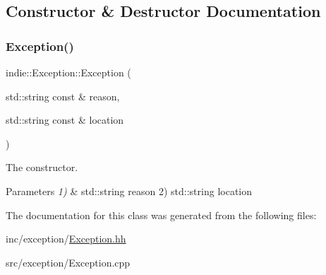\subsection{Constructor \& Destructor Documentation}
\mbox{\label{classindie_1_1Exception_a68279adc3c4acbc7f43c76502f8dd19b}} 
\subsubsection{\texorpdfstring{Exception()}{Exception()}}
{\footnotesize\ttfamily indie\+::\+Exception\+::\+Exception (\begin{DoxyParamCaption}\item[{std\+::string const \&}]{reason,  }\item[{std\+::string const \&}]{location }\end{DoxyParamCaption})}



The constructor. 


\begin{DoxyParams}{Parameters}
{\em 1)} & std\+::string reason 2) std\+::string location \\
\hline
\end{DoxyParams}


The documentation for this class was generated from the following files\+:\begin{DoxyCompactItemize}
\item 
inc/exception/\hyperlink{Exception_8hh}{Exception.\+hh}\item 
src/exception/Exception.\+cpp\end{DoxyCompactItemize}

